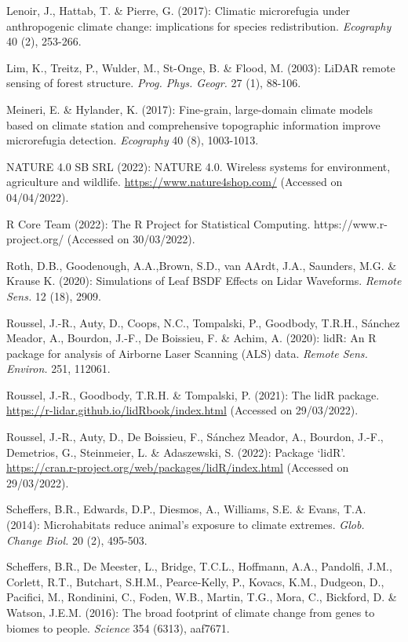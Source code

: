 \documentclass[5p]{elsarticle} %
\newlength{\cslhangindent}
\newlength{\cslentryspacingunit} %
\newenvironment{CSLReferences}[2] %
 {%
  \setlength{\parindent}{0pt}
  \ifodd #1
  \let\oldpar\par
  \def\par{\hangindent=\cslhangindent\oldpar}
  \fi
  \setlength{\parskip}{#2\cslentryspacingunit}
 }%
 {}
\begin{document}
\begin{CSLReferences}{1}{0}
Lenoir, J., Hattab, T. \& Pierre, G. (2017): Climatic microrefugia under anthropogenic climate change: implications for species redistribution. \emph{Ecography} 40 (2), 253-266.

Lim, K., Treitz, P., Wulder, M., St-Onge, B. \& Flood, M. (2003): LiDAR remote sensing of forest structure. \emph{Prog. Phys. Geogr.} 27 (1), 88-106.

Meineri, E. \& Hylander, K. (2017): Fine-grain, large-domain climate models based on climate station and comprehensive topographic information improve microrefugia detection. \emph{Ecography} 40 (8), 1003-1013.

NATURE 4.0 SB SRL (2022): NATURE 4.0. Wireless systems for environment, agriculture and wildlife. \url{https://www.nature4shop.com/} (Accessed on 04/04/2022).

R Core Team (2022): The R Project for Statistical Computing. https://www.r-project.org/ (Accessed on 30/03/2022). 

Roth, D.B., Goodenough, A.A.,Brown, S.D., van AArdt, J.A., Saunders, M.G. \& Krause K. (2020): Simulations of Leaf BSDF Effects on Lidar Waveforms. \emph{Remote Sens.} 12 (18), 2909.

Roussel, J.-R., Auty, D., Coops, N.C., Tompalski, P., Goodbody, T.R.H., Sánchez Meador, A., Bourdon, J.-F., De Boissieu, F. \& Achim, A. (2020): lidR: An R package for analysis of Airborne Laser Scanning (ALS) data. \emph{Remote Sens. Environ.} 251, 112061.

Roussel, J.-R., Goodbody, T.R.H. \& Tompalski, P. (2021): The lidR package. \url{https://r-lidar.github.io/lidRbook/index.html} (Accessed on 29/03/2022).

Roussel, J.-R., Auty, D., De Boissieu, F., Sánchez Meador, A., Bourdon, J.-F., Demetrios, G., Steinmeier, L. \& Adaszewski, S. (2022): Package ‘lidR’. \url{https://cran.r-project.org/web/packages/lidR/index.html} (Accessed on 29/03/2022).

Scheffers, B.R., Edwards, D.P., Diesmos, A., Williams, S.E. \& Evans, T.A. (2014): Microhabitats reduce animal’s exposure to climate extremes. \emph{Glob. Change Biol.} 20 (2), 495-503.

Scheffers, B.R., De Meester, L., Bridge, T.C.L., Hoffmann, A.A., Pandolfi, J.M., Corlett, R.T., Butchart, S.H.M., Pearce-Kelly, P., Kovacs, K.M., Dudgeon, D., Pacifici, M., Rondinini, C., Foden, W.B., Martin, T.G., Mora, C., Bickford, D. \& Watson, J.E.M. (2016): The broad footprint of climate change from genes to biomes to people. \emph{Science} 354 (6313), aaf7671.


\end{CSLReferences}
\end{document}
